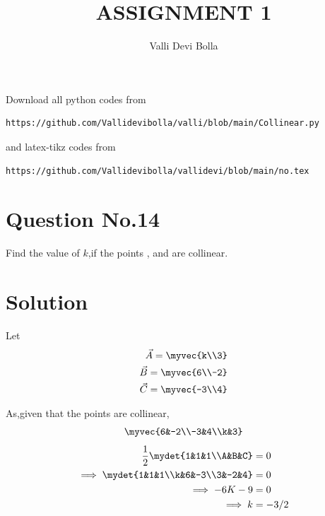 \documentclass[journal,12pt,twocolumn]{IEEEtran}
\begin{document}
\def\rightbox#1{\makebox[0in][r]{#1}}
\def\centbox#1{\makebox[0in]{#1}}
\def\topbox#1{\raisebox{-\baselineskip}[0in][0in]{#1}}
\def\midbox#1{\raisebox{-0.5\baselineskip}[0in][0in]{#1}}
\vspace{3cm}
\title{ASSIGNMENT 1}
\author{Valli Devi Bolla}
\maketitle
\newpage
\bigskip
\renewcommand{\thefigure}{\theenumi}
\renewcommand{\thetable}{\theenumi}
Download all python codes from
\begin{lstlisting}
https://github.com/Vallidevibolla/valli/blob/main/Collinear.py
\end{lstlisting}
%
and latex-tikz codes from
%
\begin{lstlisting}
https://github.com/Vallidevibolla/vallidevi/blob/main/no.tex
\end{lstlisting}
%
\section{Question No.14}
Find the value of $k$,if the points , 
 and  are collinear.
\section{Solution}
Let
\begin{align}
\vec{A}=\myvec{k\\3} \\
\vec{B}=\myvec{6\\-2}\\
\vec{C}=\myvec{-3\\4}
\end{align}
 
As,given that the points are collinear,
\begin{align}
\myvec{6&-2\\-3&4\\k&3}
\end{align}
\begin{align}
\frac{1}{2}\mydet{1&1&1\\A&B&C}&=0\\
\implies\mydet{1&1&1\\k&6&-3\\3&-2&4}&=0\\
\implies -6K-9&=0\\
\implies {k}&={-3/2}
\end{align}
\end{document}
